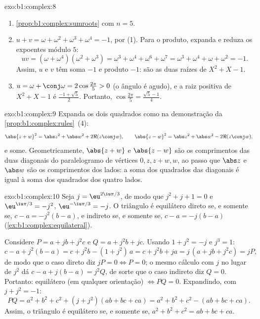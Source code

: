 \begin{solution}{exo:b1:complex:8}
\begin{enumerate}
  \item \cref{prop:b1:complex:sumroots} com $n = 5$.
  \item $u + v = \omega + \omega^2 + \omega^3 + \omega^4 = -1$, por (1).
        Para o produto, expanda e reduza os expoentes módulo $5$:
        \[
        uv = (\omega + \omega^4)(\omega^2 + \omega^3)
        = \omega^3 + \omega^4 + \omega^6 + \omega^7
        = \omega^3 + \omega^4 + \omega + \omega^2 = -1 .
        \]
        Assim, $u$ e $v$ têm soma $-1$ e produto $-1$: são as
        duas raízes de $X^2 + X - 1$.
  \item $u = \omega + \conj\omega = 2\cos\frac{2\pi}{5} > 0$ (o
        ângulo é agudo), e a raiz positiva de $X^2 + X - 1$ é
        $\frac{-1 + \sqrt 5}{2}$. Portanto, $\cos\frac{2\pi}{5} =
        \frac{\sqrt 5 - 1}{4}$.
\end{enumerate}
\end{solution}

\begin{solution}{exo:b1:complex:9}
Expanda os dois quadrados como na demonstração da
\cref{prop:b1:complex:rules}~(4):
\[
\abs{z + w}^2 = \abs z^2 + \abs w^2 + 2\Re(z\conj w),
\qquad
\abs{z - w}^2 = \abs z^2 + \abs w^2 - 2\Re(z\conj w),
\]
e some. Geometricamente, $\abs{z+w}$ e $\abs{z-w}$ são os comprimentos das
duas diagonais do paralelogramo de vértices $0, z, z+w, w$,
ao passo que $\abs z$ e $\abs w$ são os comprimentos dos lados: a soma
dos quadrados das diagonais é igual à soma dos quadrados dos quatro
lados.
\end{solution}

\begin{solution}{exo:b1:complex:10}
Seja $j = \eu^{2\iu\pi/3}$, de modo que $j^2 + j + 1 = 0$ e $\eu^{\iu\pi/3} =
-j^2$, $\eu^{-\iu\pi/3} = -j$. O triângulo é equilátero direto se, e
somente se, $c - a = -j^2 (b - a)$, e indireto se, e somente se, $c - a = -j(b - a)$
(\cref{ex:b1:complex:equilateral}).

Considere $P = a + jb + j^2 c$ e $Q = a + j^2 b + jc$. Usando $1 +
j^2 = -j$ e $j^3 = 1$:
\[
c - a + j^2(b - a) = c + j^2 b - (1 + j^2)\,a = c + j^2 b + ja
= j\,(a + jb + j^2 c) = jP,
\]
de modo que o caso direto diz $jP = 0 \iff P = 0$; o mesmo cálculo
com $j$ no lugar de $j^2$ dá $c - a + j(b - a) = j^2 Q$, de sorte que o
caso indireto diz $Q = 0$. Portanto: equilátero (em qualquer orientação)
$\iff PQ = 0$. Expandindo, com $j + j^2 = -1$:
\[
PQ = a^2 + b^2 + c^2 + (j + j^2)(ab + bc + ca)
= a^2 + b^2 + c^2 - (ab + bc + ca).
\]
Assim, o triângulo é equilátero se, e somente se, $a^2 + b^2 + c^2 = ab +
bc + ca$.
\end{solution}

